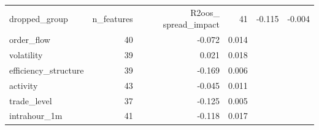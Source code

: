 \begin{tabular}{lrrr}
\toprule
dropped_group & n_features & R2oos_%
\midrule
spread_impact & 41 & -0.115 & -0.004 \\
order_flow & 40 & -0.072 & 0.014 \\
volatility & 39 & 0.021 & 0.018 \\
efficiency_structure & 39 & -0.169 & 0.006 \\
activity & 43 & -0.045 & 0.011 \\
trade_level & 37 & -0.125 & 0.005 \\
intrahour_1m & 41 & -0.118 & 0.017 \\
\bottomrule
\end{tabular}
